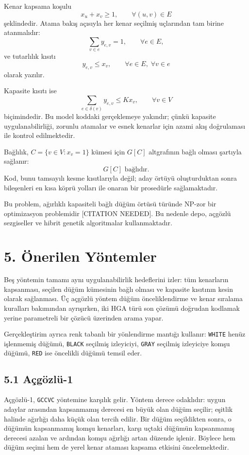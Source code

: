 \documentclass[11pt]{article}
\begin{document}
Kenar kapsama koşulu
\[
x_u+x_v\ge 1,\qquad \forall (u,v)\in E
\]
şeklindedir. Atama bakış açısıyla her kenar seçilmiş uçlarından tam birine atanmalıdır:
\[
\sum_{v\in e} y_{e,v}=1,\qquad \forall e\in E,
\]
ve tutarlılık kısıtı
\[
y_{e,v}\le x_v,\qquad \forall e\in E,\; \forall v\in e
\]
olarak yazılır.

Kapasite kısıtı ise
\[
\sum_{e\in \delta(v)} y_{e,v}\le Kx_v,\qquad \forall v\in V
\]
biçimindedir. Bu model koddaki gerçeklemeye yakındır; çünkü kapasite uygulanabilirliği, zorunlu atamalar ve esnek kenarlar için azami akış doğrulaması ile kontrol edilmektedir.

Bağlılık, \(C=\{v\in V:x_v=1\}\) kümesi için \(G[C]\) altgrafının bağlı olması şartıyla sağlanır:
\[
G[C]\text{ bağlıdır.}
\]
Kod, bunu tamsayılı kesme kısıtlarıyla değil; aday örtüyü oluşturduktan sonra bileşenleri en kısa köprü yolları ile onaran bir prosedürle sağlamaktadır.

Bu problem, ağırlıklı kapasiteli bağlı düğüm örtüsü türünde NP-zor bir optimizasyon problemidir [CITATION NEEDED]. Bu nedenle depo, açgözlü sezgiseller ve hibrit genetik algoritmalar kullanmaktadır.

\section*{5. Önerilen Yöntemler}

Beş yöntemin tamamı aynı uygulanabilirlik hedeflerini izler: tüm kenarların kapsanması, seçilen düğüm kümesinin bağlı olması ve kapasite kısıtının kesin olarak sağlanması. Üç açgözlü yöntem düğüm önceliklendirme ve kenar sıralama kuralları bakımından ayrışırken, iki HGA türü son çözümü doğrudan kodlamak yerine parametreli bir çözücü üzerinden arama yapar.

Gerçekleştirim ayrıca renk tabanlı bir yönlendirme mantığı kullanır: \texttt{WHITE} henüz işlenmemiş düğümü, \texttt{BLACK} seçilmiş izleyiciyi, \texttt{GRAY} seçilmiş izleyiciye komşu düğümü, \texttt{RED} ise öncelikli düğümü temsil eder.

\subsection*{5.1 Açgözlü-1}

Açgözlü-1, \texttt{GCCVC} yöntemine karşılık gelir. Yöntem derece odaklıdır: uygun adaylar arasından kapsanmamış derecesi en büyük olan düğüm seçilir; eşitlik halinde ağırlığı daha küçük olan tercih edilir. Bir düğüm seçildikten sonra, o düğümün kapsanmamış komşu kenarları, karşı uçtaki düğümün kapsanmamış derecesi azalan ve ardından komşu ağırlığı artan düzende işlenir. Böylece hem düğüm seçimi hem de yerel kenar ataması kapsama etkisini öncelemektedir.
\end{document}
